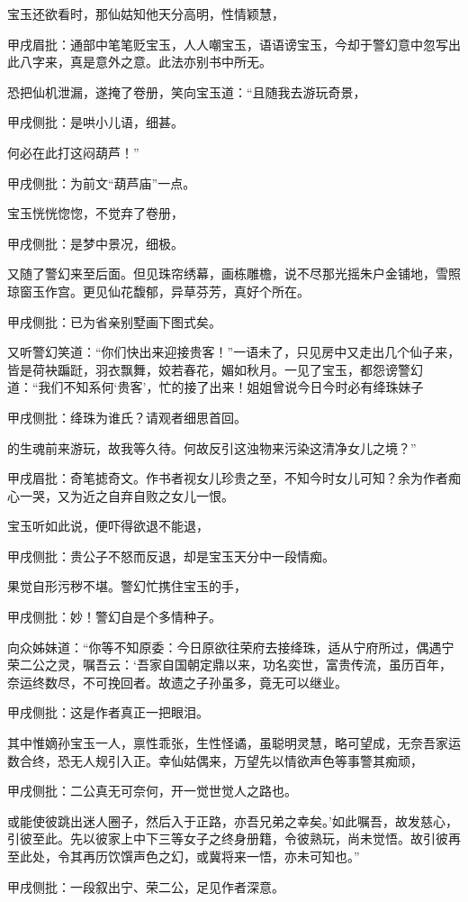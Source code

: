 \begin{parag}
    宝玉还欲看时，那仙姑知他天分高明，性情颖慧，\begin{note}甲戌眉批：通部中笔笔贬宝玉，人人嘲宝玉，语语谤宝玉，今却于警幻意中忽写出此八字来，真是意外之意。此法亦别书中所无。\end{note}恐把仙机泄漏，遂掩了卷册，笑向宝玉道：“且随我去游玩奇景，\begin{note}甲戌侧批：是哄小儿语，细甚。\end{note}何必在此打这闷葫芦！”\begin{note}甲戌侧批：为前文“葫芦庙”一点。\end{note}
\end{parag}


\begin{parag}
    宝玉恍恍惚惚，不觉弃了卷册，\begin{note}甲戌侧批：是梦中景况，细极。\end{note}又随了警幻来至后面。但见珠帘绣幕，画栋雕檐，说不尽那光摇朱户金铺地，雪照琼窗玉作宫。更见仙花馥郁，异草芬芳，真好个所在。\begin{note}甲戌侧批：已为省亲别墅画下图式矣。\end{note}又听警幻笑道：“你们快出来迎接贵客！”一语未了，只见房中又走出几个仙子来，皆是荷袂蹁跹，羽衣飘舞，姣若春花，媚如秋月。一见了宝玉，都怨谤警幻道：“我们不知系何‘贵客’，忙的接了出来！姐姐曾说今日今时必有绛珠妹子\begin{note}甲戌侧批：绛珠为谁氏？请观者细思首回。\end{note}的生魂前来游玩，故我等久待。何故反引这浊物来污染这清净女儿之境？”\begin{note}甲戌眉批：奇笔摅奇文。作书者视女儿珍贵之至，不知今时女儿可知？余为作者痴心一哭，又为近之自弃自败之女儿一恨。\end{note}宝玉听如此说，便吓得欲退不能退，\begin{note}甲戌侧批：贵公子不怒而反退，却是宝玉天分中一段情痴。\end{note}果觉自形污秽不堪。警幻忙携住宝玉的手，\begin{note}甲戌侧批：妙！警幻自是个多情种子。\end{note}向众姊妹道：“你等不知原委：今日原欲往荣府去接绛珠，适从宁府所过，偶遇宁荣二公之灵，嘱吾云：‘吾家自国朝定鼎以来，功名奕世，富贵传流，虽历百年，奈运终数尽，不可挽回者。故遗之子孙虽多，竟无可以继业。\begin{note}甲戌侧批：这是作者真正一把眼泪。\end{note}其中惟嫡孙宝玉一人，禀性乖张，生性怪谲，虽聪明灵慧，略可望成，无奈吾家运数合终，恐无人规引入正。幸仙姑偶来，万望先以情欲声色等事警其痴顽，\begin{note}甲戌侧批：二公真无可奈何，开一觉世觉人之路也。\end{note}或能使彼跳出迷人圈子，然后入于正路，亦吾兄弟之幸矣。’如此嘱吾，故发慈心，引彼至此。先以彼家上中下三等女子之终身册籍，令彼熟玩，尚未觉悟。故引彼再至此处，令其再历饮馔声色之幻，或冀将来一悟，亦未可知也。”\begin{note}甲戌侧批：一段叙出宁、荣二公，足见作者深意。\end{note}
\end{parag}


